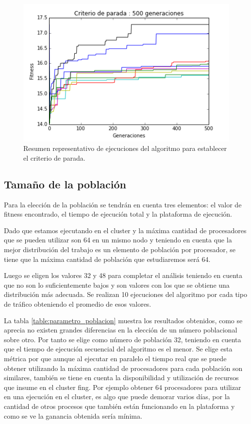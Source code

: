 \begin{figure}[h]
\centering
\includegraphics[width=0.8\linewidth]{Figures/criterio_parada}
\caption{Resumen representativo de ejecuciones del algoritmo para establecer el criterio de parada.}
\label{fig:criterio_parada}
\end{figure}



\subsection{Tamaño de la población}

Para la elección de la población se tendrán en cuenta tres elementos: el valor de fitness encontrado, el tiempo de ejecución total y la plataforma de ejecución.

Dado que estamos ejecutando en el cluster y la máxima cantidad de procesadores que se pueden utilizar son 64 en un mismo nodo y teniendo en cuenta que la mejor distribución del trabajo es un elemento de población por procesador, se tiene que la máxima cantidad de población que estudiaremos será 64.

Luego se eligen los valores 32 y 48 para completar el análisis teniendo en cuenta que no son lo suficientemente bajos y son valores con los que se obtiene una distribución más adecuada. Se realizan 10 ejecuciones del algoritmo por cada tipo de tráfico obteniendo el promedio de esos valores.

La tabla \ref{table:parametro_poblacion} muestra los resultados obtenidos, como se aprecia no existen grandes diferencias en la elección de un número poblacional sobre otro. Por tanto se elige como número de población 32, teniendo en cuenta que el tiempo de ejecución secuencial del algoritmo es el menor. Se elige esta métrica por que aunque al ejecutar en paralelo el tiempo real que se puede obtener utilizando la máxima cantidad de procesadores para cada población son similares, también se tiene en cuenta la disponibilidad y utilización de recursos que insume en el cluster fing. Por ejemplo obtener 64 procesadores para utilizar en una ejecución en el cluster, es algo que puede demorar varios días, por la cantidad de otros procesos que también están funcionando en la plataforma y como se ve la ganancia obtenida sería mínima.


